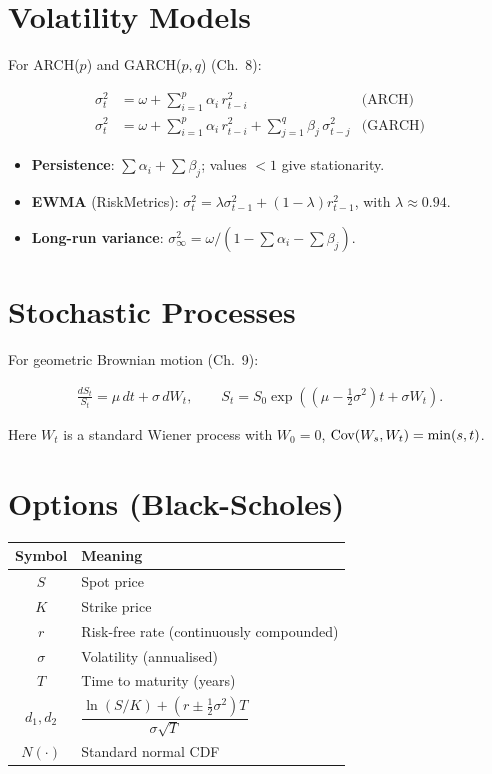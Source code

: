 \section{Volatility Models}

For ARCH($p$) and GARCH($p, q$) (Ch.~8):

\begin{align}
\sigma_t^2 &= \omega + \sum_{i=1}^{p} \alpha_i \, r_{t-i}^2 & \text{(ARCH)} \\
\sigma_t^2 &= \omega + \sum_{i=1}^{p} \alpha_i \, r_{t-i}^2 + \sum_{j=1}^{q} \beta_j \, \sigma_{t-j}^2 & \text{(GARCH)}
\end{align}

\begin{itemize}
    \item \textbf{Persistence}: $\sum \alpha_i + \sum \beta_j$; values
      $< 1$ give stationarity.
    \item \textbf{EWMA} (RiskMetrics): $\sigma_t^2 = \lambda \sigma_{t-1}^2 + (1 - \lambda) r_{t-1}^2$, with $\lambda \approx 0.94$.
    \item \textbf{Long-run variance}: $\sigma_\infty^2 = \omega / (1 - \sum \alpha_i - \sum \beta_j)$.
\end{itemize}

\section{Stochastic Processes}

For geometric Brownian motion (Ch.~9):

\begin{align}
\frac{dS_t}{S_t} = \mu \, dt + \sigma \, dW_t, \qquad S_t = S_0 \exp\!\left( \left(\mu - \tfrac{1}{2}\sigma^2\right)t + \sigma W_t \right).
\end{align}

Here $W_t$ is a standard Wiener process with $W_0 = 0$,
$\text{Cov}(W_s, W_t) = \min(s, t)$.

\section{Options (Black-Scholes)}

\begin{center}
\begin{tabular}{cl}
\toprule
\textbf{Symbol} & \textbf{Meaning} \\
\midrule
$S$ & Spot price \\
$K$ & Strike price \\
$r$ & Risk-free rate (continuously compounded) \\
$\sigma$ & Volatility (annualised) \\
$T$ & Time to maturity (years) \\
$d_1, d_2$ & $\dfrac{\ln(S/K) + (r \pm \tfrac{1}{2}\sigma^2)T}{\sigma \sqrt{T}}$ \\
$N(\cdot)$ & Standard normal CDF \\
\bottomrule
\end{tabular}
\end{center}

